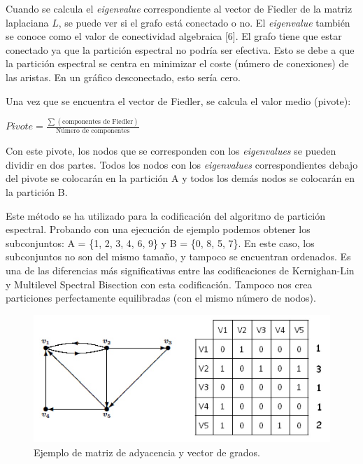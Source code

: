 Cuando se calcula el \textit{eigenvalue} correspondiente al vector de Fiedler de la matriz laplaciana $L$, se puede ver si el grafo está conectado o no. El \textit{eigenvalue} también se conoce como el valor de conectividad algebraica [6]. El grafo tiene que estar conectado ya que la partición espectral no podría ser efectiva. Esto se debe a que la partición espectral se centra en minimizar el coste (número de conexiones) de las aristas. En un gráfico desconectado, esto sería cero. 

Una vez que se encuentra el vector de Fiedler, se calcula el valor medio (pivote):

\begin{center}
	$Pivote = \frac{\sum (\text{componentes de Fiedler})}{\text{Número de componentes}}$
\end{center}

Con este pivote, los nodos que se corresponden con los \textit{eigenvalues} se pueden dividir en dos partes. Todos los nodos con los \textit{eigenvalues} correspondientes debajo del pivote se colocarán en la partición A y todos los demás nodos se colocarán en la partición B. 

Este método se ha utilizado para la codificación del algoritmo de partición espectral. Probando con una ejecución de ejemplo podemos obtener los subconjuntos: A = \{1, 2, 3, 4, 6, 9\} y B = \{0, 8, 5, 7\}. En este caso, los subconjuntos no son del mismo tamaño, y tampoco se encuentran ordenados. Es una de las diferencias más significativas entre las codificaciones de Kernighan-Lin y Multilevel Spectral Bisection con esta codificación. Tampoco nos crea particiones perfectamente equilibradas (con el mismo número de nodos).

\begin{figure}[h]
	\centering
	\includegraphics[scale=0.45]{Figures/matriz}
	\vspace{1mm}
	\caption{Ejemplo de matriz de adyacencia y vector de grados.}
	\label{matriz_adyacencia}
\end{figure}

